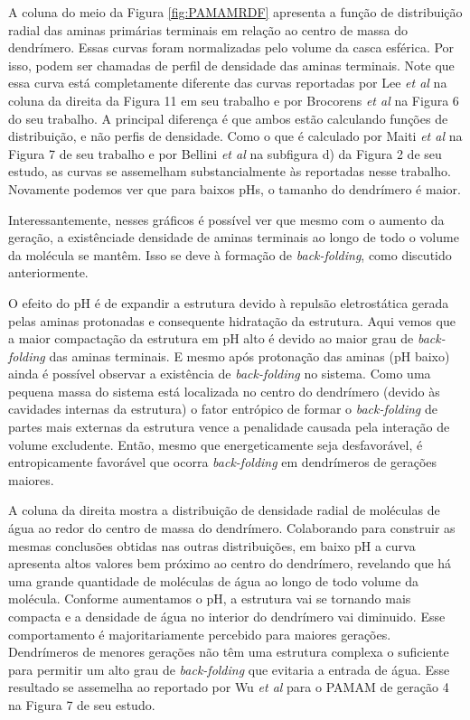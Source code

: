 A coluna do meio da Figura \ref{fig:PAMAMRDF} apresenta a função de distribuição radial das aminas primárias terminais em relação ao centro de massa do dendrímero.
Essas curvas foram normalizadas pelo volume da casca esférica. 
Por isso, podem ser chamadas de perfil de densidade das aminas terminais. 
Note que essa curva está completamente diferente das curvas reportadas por Lee \textit{et al}\cite{Lee2002} na coluna da direita da Figura 11 em seu trabalho e por Brocorens \textit{et al}\cite{Brocorens2005} na Figura 6 do seu trabalho.
A principal diferença é que ambos estão calculando funções de distribuição, e não perfis de densidade.
Como o que é calculado por Maiti \textit{et al}\cite{Maiti2004} na Figura 7 de seu trabalho e por Bellini \textit{et al}\cite{Bellini2015} na subfigura d) da Figura 2 de seu estudo, as curvas se assemelham substancialmente às reportadas nesse trabalho. 
Novamente podemos ver que para baixos pHs, o tamanho do dendrímero é maior.

Interessantemente, nesses gráficos é possível ver que mesmo com o aumento da geração, a existênciade densidade de aminas terminais ao longo de todo o volume da molécula se mantêm.
Isso se deve à formação de \textit{back-folding}, como discutido anteriormente.

O efeito do pH é de expandir a estrutura devido à repulsão eletrostática gerada pelas aminas protonadas e consequente hidratação da estrutura. Aqui vemos que a maior compactação da estrutura em pH alto é devido ao maior grau de \textit{back-folding} das aminas terminais. 
E mesmo após protonação das aminas (pH baixo) ainda é possível observar a existência de \textit{back-folding} no sistema. 
Como uma pequena massa do sistema está localizada no centro do dendrímero (devido às cavidades internas da estrutura) o fator entrópico de formar o \textit{back-folding} de partes mais externas da estrutura vence a penalidade causada pela interação de volume excludente.
Então, mesmo que energeticamente seja desfavorável, é entropicamente favorável que ocorra \textit{back-folding} em dendrímeros de gerações maiores\cite{Rathgeber2004}.

A coluna da direita mostra a distribuição de densidade radial de moléculas de água ao redor do centro de massa do dendrímero. 
Colaborando para construir as mesmas conclusões obtidas nas outras distribuições, em baixo pH a curva apresenta altos valores bem próximo ao centro do dendrímero, revelando que há uma grande quantidade de moléculas de água ao longo de todo volume da molécula.
Conforme aumentamos o pH, a estrutura vai se tornando mais compacta e a densidade de água no interior do dendrímero vai diminuido.
Esse comportamento é majoritariamente percebido para maiores gerações.
Dendrímeros de menores gerações não têm uma estrutura complexa o suficiente para permitir um alto grau de \textit{back-folding} que evitaria a entrada de água.
Esse resultado se assemelha ao reportado por Wu \textit{et al}\cite{Wu2012} para o PAMAM de geração 4 na Figura 7 de seu estudo.

